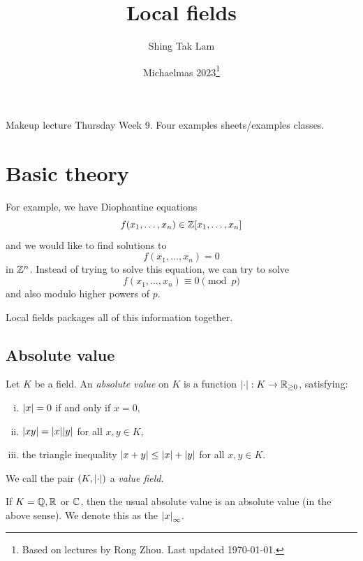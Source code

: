 \documentclass{article}
\title{Local fields}
\author{Shing Tak Lam}
\date{Michaelmas 2023\footnote{Based on lectures by Rong Zhou. Last updated \today.}}
\begin{document}
\maketitle

\tableofcontents


\lec

\printindex

Makeup lecture Thursday Week 9. Four examples sheets/examples classes.

\section{Basic theory}

For example, we have Diophantine equations
\[f(x_1, \dots, x_n) \in \mathbb{Z}[x_1, \dots, x_n]\]
and we would like to find solutions to
\[f(x_1, \dots, x_n) = 0\]
in \(\mathbb{Z}^n\). Instead of trying to solve this equation, we can try to solve
\[f(x_1, \dots, x_n) \equiv 0 \pmod p\]
and also modulo higher powers of \(p\).

Local fields packages all of this information together.

\subsection{Absolute value}

\begin{definition}
     Let \(K\) be a field. An \emph{absolute value} on \(K\) is a function \(\abs{\cdot} : K \to \mathbb{R}_{\ge 0}\), satisfying:
    \begin{enumerate}[(i)]
        \item \(\abs{x} = 0\) if and only if \(x = 0\),
        \item \(\abs{xy} = \abs{x}\abs{y}\) for all \(x, y \in K\),
        \item the triangle inequality \(\abs{x + y} \le \abs{x} + \abs{y}\) for all \(x, y \in K\).
    \end{enumerate}
\end{definition}

We call the pair \((K, \abs{\cdot})\) a \emph{value field}. 

\begin{example}
    If \(K = \mathbb{Q}, \mathbb{R}\) or \(\mathbb{C}\), then the usual absolute value is an absolute value (in the above sense). We denote this as the \(\abs{x}_\infty\).
\end{example}
\end{document}

